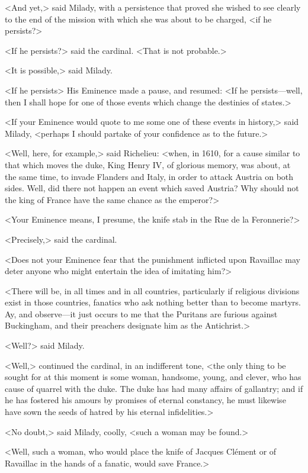 <And yet,> said Milady, with a persistence that proved she wished to see clearly to the end of the mission with which she was about to be charged, <if he persists?> 

<If he persists?> said the cardinal. <That is not probable.> 

<It is possible,> said Milady. 

<If he persists\longdash> His Eminence made a pause, and resumed: <If he persists---well, then I shall hope for one of those events which change the destinies of states.> 

<If your Eminence would quote to me some one of these events in history,> said Milady, <perhaps I should partake of your confidence as to the future.> 

<Well, here, for example,> said Richelieu: <when, in 1610, for a cause similar to that which moves the duke, King Henry IV, of glorious memory, was about, at the same time, to invade Flanders and Italy, in order to attack Austria on both sides. Well, did there not happen an event which saved Austria? Why should not the king of France have the same chance as the emperor?> 

<Your Eminence means, I presume, the knife stab in the Rue de la Feronnerie?> 

<Precisely,> said the cardinal. 

<Does not your Eminence fear that the punishment inflicted upon Ravaillac may deter anyone who might entertain the idea of imitating him?> 

<There will be, in all times and in all countries, particularly if religious divisions exist in those countries, fanatics who ask nothing better than to become martyrs. Ay, and observe---it just occurs to me that the Puritans are furious against Buckingham, and their preachers designate him as the Antichrist.> 

<Well?> said Milady. 

<Well,> continued the cardinal, in an indifferent tone, <the only thing to be sought for at this moment is some woman, handsome, young, and clever, who has cause of quarrel with the duke. The duke has had many affairs of gallantry; and if he has fostered his amours by promises of eternal constancy, he must likewise have sown the seeds of hatred by his eternal infidelities.> 

<No doubt,> said Milady, coolly, <such a woman may be found.> 

<Well, such a woman, who would place the knife of Jacques Clément or of Ravaillac in the hands of a fanatic, would save France.> 

